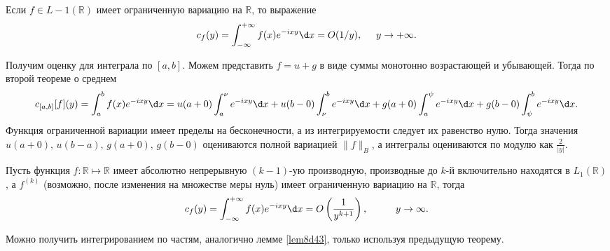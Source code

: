 

\begin{to_thr}[]
    Если $f \in L-1 (\mathbb{R})$ имеет ограниченную вариацию на $\mathbb{R}$, то выражение
    \begin{equation*}
        c_f (y) = \int_{-\infty}^{+\infty} f(x) e^{-ixy} \d x = O(1/y),
        \hspace{5 mm} y \to +\infty.
    \end{equation*}
\end{to_thr}

\begin{uproof}
    Получим оценку для интеграла по $[a, b]$. Можем представить $f = u + g$ в виде суммы монотонно возрастающей и убывающей. Тогда по второй теореме о среднем
    \begin{equation*}
        c_{[a, b]}[f](y) = \int_{a}^{b} f(x) e^{-ixy} \d x = u(a+0) 
        \int_{a}^{\nu} e^{-ixy} \d x + u(b-0) \int_{\nu}^{b} e^{-ixy} \d x + 
        g(a+0) \int_{a}^{\psi} e^{-ixy} \d x + g(b-0) \int_{\psi}^{b} e^{-ixy} \d x.
    \end{equation*}
    Функция ограниченной вариации имеет пределы на бесконечности, а из интегрируемости следует их равенство нулю. Тогда значения $u(a+0),\, u(b-a),\, g(a+0),\, g(b-0)$ оцениваются полной вариацией $\|f\|_B$, а интегралы оцениваются по модулю как $\frac{2}{|y|}$. 
\end{uproof}




\begin{to_con}
    Пусть функция $f \colon \mathbb{R} \mapsto \mathbb{R}$ имеет абсолютно непрерывную $(k-1)$-ую производную, производные до $k$-й включительно находятся в $L_1 (\mathbb{R})$, а $f^{(k)}$ (возможно, после изменения на множестве меры нуль) имеет ограниченную вариацию на $\mathbb{R}$, тогда
    \begin{equation*}
        c_f (y) = \int_{-\infty}^{+\infty} 
        f(x) e^{-ixy} \d x =
        O\left(\frac{1}{y^{k+1}}\right), 
        \hspace{1 cm}
        y \to \infty.
    \end{equation*}
\end{to_con}


\begin{uproof}
    Можно получить интегрированием по частям, аналогично лемме \ref{lem8d43}, только используя предыдущую теорему. 
\end{uproof}




